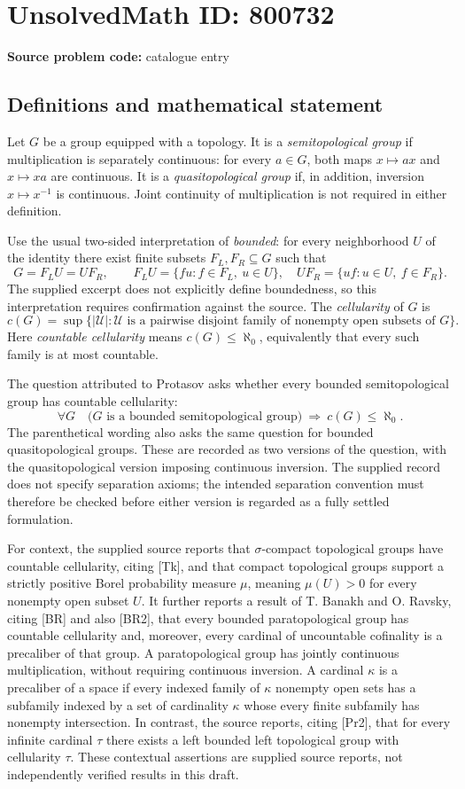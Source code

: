 \documentclass[11pt]{article}
\begin{document}
\section*{UnsolvedMath ID: 800732}
\textbf{Source problem code:} catalogue entry
\subsection{Definitions and mathematical statement}
Let \(G\) be a group equipped with a topology. It is a \emph{semitopological group} if multiplication is separately continuous: for every \(a\in G\), both maps \(x\mapsto ax\) and \(x\mapsto xa\) are continuous. It is a \emph{quasitopological group} if, in addition, inversion \(x\mapsto x^{-1}\) is continuous. Joint continuity of multiplication is not required in either definition.

Use the usual two-sided interpretation of \emph{bounded}: for every neighborhood \(U\) of the identity there exist finite subsets \(F_L,F_R\subseteq G\) such that
\[
G=F_LU=UF_R,
\qquad F_LU=\{fu:f\in F_L,\ u\in U\},\quad UF_R=\{uf:u\in U,\ f\in F_R\}.
\]
The supplied excerpt does not explicitly define boundedness, so this interpretation requires confirmation against the source. The \emph{cellularity} of \(G\) is
\[
c(G)=\sup\bigl\{|\mathcal U|:\mathcal U\text{ is a pairwise disjoint family of nonempty open subsets of }G\bigr\}.
\]
Here \emph{countable cellularity} means \(c(G)\leq\aleph_0\), equivalently that every such family is at most countable.

The question attributed to Protasov asks whether every bounded semitopological group has countable cellularity:
\[
\forall G\quad
\bigl(G\text{ is a bounded semitopological group}\bigr)
\ \Longrightarrow\ c(G)\leq\aleph_0.
\]
The parenthetical wording also asks the same question for bounded quasitopological groups. These are recorded as two versions of the question, with the quasitopological version imposing continuous inversion. The supplied record does not specify separation axioms; the intended separation convention must therefore be checked before either version is regarded as a fully settled formulation.

For context, the supplied source reports that \(\sigma\)-compact topological groups have countable cellularity, citing [Tk], and that compact topological groups support a strictly positive Borel probability measure \(\mu\), meaning \(\mu(U)>0\) for every nonempty open subset \(U\). It further reports a result of T. Banakh and O. Ravsky, citing [BR] and also [BR2], that every bounded paratopological group has countable cellularity and, moreover, every cardinal of uncountable cofinality is a precaliber of that group. A paratopological group has jointly continuous multiplication, without requiring continuous inversion. A cardinal \(\kappa\) is a precaliber of a space if every indexed family of \(\kappa\) nonempty open sets has a subfamily indexed by a set of cardinality \(\kappa\) whose every finite subfamily has nonempty intersection. In contrast, the source reports, citing [Pr2], that for every infinite cardinal \(\tau\) there exists a left bounded left topological group with cellularity \(\tau\). These contextual assertions are supplied source reports, not independently verified results in this draft.
\end{document}
